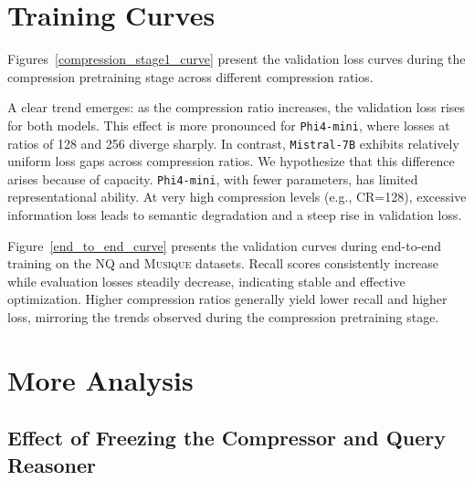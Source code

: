 \documentclass{applemlr}
\numberwithin{equation}{section}
\begin{document}
\section{Training Curves}
\label{app:train_curve}
Figures~\ref{compression_stage1_curve} present the validation loss curves during the compression pretraining stage across different compression ratios. 

A clear trend emerges: as the compression ratio increases, the validation loss rises for both models. 
This effect is more pronounced for \texttt{Phi4-mini}, where losses at ratios of 128 and 256 diverge sharply. 
In contrast, \texttt{Mistral-7B} exhibits relatively uniform loss gaps across compression ratios. 
We hypothesize that this difference arises because of capacity. \texttt{Phi4-mini}, with fewer parameters, has limited representational ability. At very high compression levels (e.g., CR=128), excessive information loss leads to semantic degradation and a steep rise in validation loss.

Figure~\ref{end_to_end_curve} presents the validation curves during end-to-end training on the \textsc{NQ} and \textsc{Musique} datasets. 
Recall scores consistently increase while evaluation losses steadily decrease, indicating stable and effective optimization. 
Higher compression ratios generally yield lower recall and higher loss, mirroring the trends observed during the compression pretraining stage.

\section{More Analysis}
\label{app:more_analysis}
\subsection{Effect of Freezing the Compressor and Query Reasoner}
\end{document}
